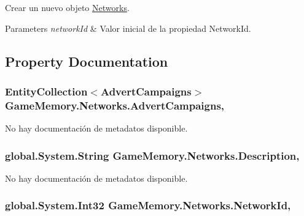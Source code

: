 Crear un nuevo objeto \hyperlink{class_game_memory_1_1_networks}{Networks}. 


\begin{DoxyParams}{Parameters}
{\em network\-Id} & Valor inicial de la propiedad Network\-Id.\\
\hline
\end{DoxyParams}


\subsection{Property Documentation}
\hypertarget{class_game_memory_1_1_networks_aeff3d628f46ff88b75b6c8560965690d}{
\subsubsection[{Advert\-Campaigns}]{\setlength{\rightskip}{0pt plus 5cm}Entity\-Collection$<${\bf Advert\-Campaigns}$>$ Game\-Memory.\-Networks.\-Advert\-Campaigns\hspace{0.3cm}{\ttfamily [get]}, {\ttfamily [set]}}}\label{class_game_memory_1_1_networks_aeff3d628f46ff88b75b6c8560965690d}


No hay documentación de metadatos disponible. 

\hypertarget{class_game_memory_1_1_networks_a0d21cf294bbf9f1be6d0d43875997ba3}{
\subsubsection[{Description}]{\setlength{\rightskip}{0pt plus 5cm}global.\-System.\-String Game\-Memory.\-Networks.\-Description\hspace{0.3cm}{\ttfamily [get]}, {\ttfamily [set]}}}\label{class_game_memory_1_1_networks_a0d21cf294bbf9f1be6d0d43875997ba3}


No hay documentación de metadatos disponible. 

\hypertarget{class_game_memory_1_1_networks_a111b12af812530cd931a0a094db04d01}{
\subsubsection[{Network\-Id}]{\setlength{\rightskip}{0pt plus 5cm}global.\-System.\-Int32 Game\-Memory.\-Networks.\-Network\-Id\hspace{0.3cm}{\ttfamily [get]}, {\ttfamily [set]}}}\label{class_game_memory_1_1_networks_a111b12af812530cd931a0a094db04d01}


